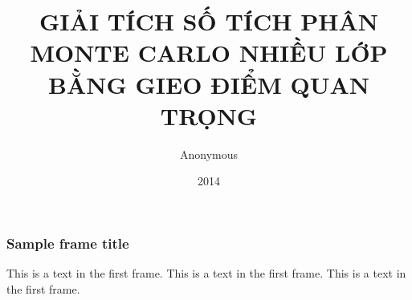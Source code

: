 \documentclass{beamer}
\title{GIẢI TÍCH SỐ TÍCH PHÂN MONTE CARLO NHIỀU LỚP BẰNG GIEO ĐIỂM QUAN TRỌNG}
\author{Anonymous}
\institute{Overleaf}
\date{2014}
\begin{document}
 
\frame{\titlepage}
 
\begin{frame}
\frametitle{Sample frame title}
This is a text in the first frame. This is a text in the first frame. This is a text in the first frame.
\end{frame}
 
\end{document}
